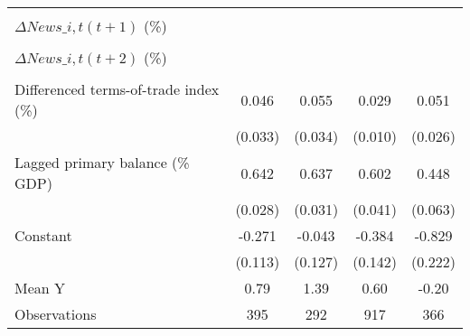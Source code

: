 {\begin{tabular}{l*{4}{c}}
                    &                     &                     &                     &                     \\
\addlinespace
$ \Delta News\_{i,t}(t+1)$ (\%)&                     &                     &                     &                     \\
                    &                     &                     &                     &                     \\
\addlinespace
$ \Delta News\_{i,t}(t+2)$ (\%)&                     &                     &                     &                     \\
                    &                     &                     &                     &                     \\
\addlinespace
Differenced terms-of-trade index (\%)&       0.046         &       0.055         &       0.029\sym{***}&       0.051\sym{*}  \\
                    &     (0.033)         &     (0.034)         &     (0.010)         &     (0.026)         \\
\addlinespace
Lagged primary balance (\% GDP)&       0.642\sym{***}&       0.637\sym{***}&       0.602\sym{***}&       0.448\sym{***}\\
                    &     (0.028)         &     (0.031)         &     (0.041)         &     (0.063)         \\
\addlinespace
Constant            &      -0.271\sym{**} &      -0.043         &      -0.384\sym{***}&      -0.829\sym{***}\\
                    &     (0.113)         &     (0.127)         &     (0.142)         &     (0.222)         \\
\midrule
Mean Y              &        0.79         &        1.39         &        0.60         &       -0.20         \\
Observations        &         395         &         292         &         917         &         366         \\
\bottomrule
\end{tabular}
}
